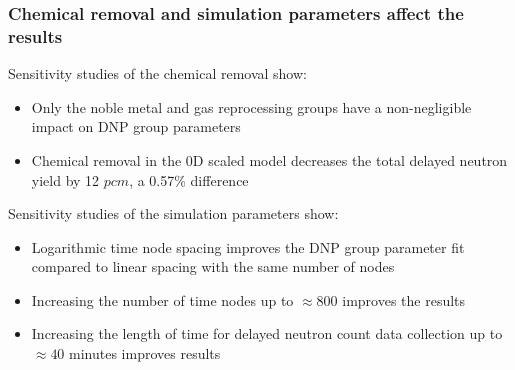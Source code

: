 \begin{frame}
  \frametitle{Chemical removal and simulation parameters affect the results}
    \begin{block}{Sensitivity studies of the chemical removal show:}
        \begin{itemize}
            \item Only the noble metal and gas reprocessing groups have a non-negligible impact on \gls{DNP} group parameters
            \item Chemical removal in the 0D scaled model decreases the total delayed neutron yield by 12 $pcm$, a 0.57\% difference
        \end{itemize}
    \end{block}
    \begin{block}{Sensitivity studies of the simulation parameters show:}
        \begin{itemize}
            \item Logarithmic time node spacing improves the \gls{DNP} group parameter fit compared to linear spacing with the same number of nodes
            \item Increasing the number of time nodes up to $\approx 800$ improves the results
            \item Increasing the length of time for delayed neutron count data collection up to $\approx 40$ minutes improves results
        \end{itemize}
    \end{block}
\end{frame}
